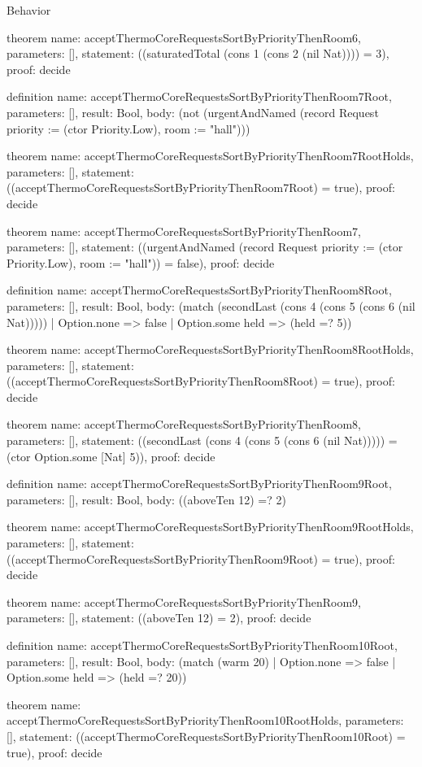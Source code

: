 \begin{lexlean}{Behavior}
\begin{semanticmodule}
theorem{
  name: acceptThermoCoreRequestsSortByPriorityThenRoom6,
  parameters: [],
  statement: ((saturatedTotal (cons 1 (cons 2 (nil Nat)))) = 3),
  proof: decide{}
}

definition{
  name: acceptThermoCoreRequestsSortByPriorityThenRoom7Root,
  parameters: [],
  result: Bool,
  body: (not (urgentAndNamed (record Request {priority := (ctor Priority.Low), room := "hall"})))
}

theorem{
  name: acceptThermoCoreRequestsSortByPriorityThenRoom7RootHolds,
  parameters: [],
  statement: ((acceptThermoCoreRequestsSortByPriorityThenRoom7Root) = true),
  proof: decide{}
}

theorem{
  name: acceptThermoCoreRequestsSortByPriorityThenRoom7,
  parameters: [],
  statement: ((urgentAndNamed (record Request {priority := (ctor Priority.Low), room := "hall"})) = false),
  proof: decide{}
}

definition{
  name: acceptThermoCoreRequestsSortByPriorityThenRoom8Root,
  parameters: [],
  result: Bool,
  body: (match (secondLast (cons 4 (cons 5 (cons 6 (nil Nat)))))
    | Option.none => false
    | Option.some held => (held =? 5))
}

theorem{
  name: acceptThermoCoreRequestsSortByPriorityThenRoom8RootHolds,
  parameters: [],
  statement: ((acceptThermoCoreRequestsSortByPriorityThenRoom8Root) = true),
  proof: decide{}
}

theorem{
  name: acceptThermoCoreRequestsSortByPriorityThenRoom8,
  parameters: [],
  statement: ((secondLast (cons 4 (cons 5 (cons 6 (nil Nat))))) = (ctor Option.some [Nat] 5)),
  proof: decide{}
}

definition{
  name: acceptThermoCoreRequestsSortByPriorityThenRoom9Root,
  parameters: [],
  result: Bool,
  body: ((aboveTen 12) =? 2)
}

theorem{
  name: acceptThermoCoreRequestsSortByPriorityThenRoom9RootHolds,
  parameters: [],
  statement: ((acceptThermoCoreRequestsSortByPriorityThenRoom9Root) = true),
  proof: decide{}
}

theorem{
  name: acceptThermoCoreRequestsSortByPriorityThenRoom9,
  parameters: [],
  statement: ((aboveTen 12) = 2),
  proof: decide{}
}

definition{
  name: acceptThermoCoreRequestsSortByPriorityThenRoom10Root,
  parameters: [],
  result: Bool,
  body: (match (warm 20) | Option.none => false | Option.some held => (held =? 20))
}

theorem{
  name: acceptThermoCoreRequestsSortByPriorityThenRoom10RootHolds,
  parameters: [],
  statement: ((acceptThermoCoreRequestsSortByPriorityThenRoom10Root) = true),
  proof: decide{}
}


\end{semanticmodule}
\end{lexlean}
